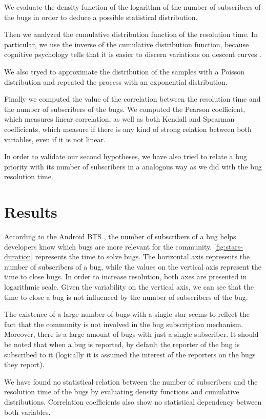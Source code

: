 \documentclass[10pt, conference, compsocconf]{IEEEtran}
\begin{document}
We evaluate the density function of the logarithm of the number of subscribers of the bugs in order to deduce a possible statistical distribution.  

Then we analyzed the cumulative distribution function of the resolution time. In particular, we use the inverse of the cumulative distribution function, because cognitive psychology tells that it is easier to discern variations on descent curves  \cite{NowYouSeeIt}.

We also tryed to approximate the distribution of the samples with a Poisson distribution and repeated the process with an exponential distribution.

Finally we computed the value of the correlation between the resolution time and the number of subscribers of the bugs. We computed the Pearson coefficient, which measures linear correlation, as well as both Kendall and Spearman coefficients, which measure if there is any kind of strong relation between both variables, even if it is not linear.

In order to validate our second hypotheses, we have also tried to relate a bug priority with its number of subscribers in a analogous way as we did with the bug resolution time.

\section{Results}
According to the Android BTS \cite{ReportBugs}, the number of subscribers of a bug helps developers know which bugs are more relevant for the community. \ref{fig:stars-duration} represents the time to solve bugs. The horizontal axis represents the number of subscribers of a bug, while the values on the vertical axis represent the time to close bugs. In order to increase resolution, both axes are presented in logarithmic scale. Given the variability on the vertical axis, we can see that the time to close a bug is not influenced by the number of subscribers of the bug.


The existence of a large number of bugs with a single star seems to reflect the fact that the community is not involved in the bug subscription mechanism. Moreover, there is a large amount of bugs with just a single subscriber. It should be noted that when a bug is reported, by default the reporter of the bug is subscribed to it (logically it is assumed the interest of the reporters on the bugs they report). 

We have found no statistical relation between the number of subscribers and the resolution time of the bugs by evaluating density functions and cumulative distributions. Correlation coefficients also show no statistical dependency between both variables.
\end{document}
